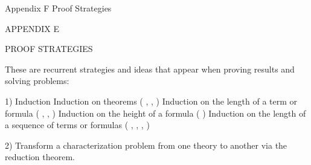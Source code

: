  {Appendix F Proof Strategies}
\centerline{\xmplbxi APPENDIX E}
\medskip
\centerline{\xmplbx PROOF STRATEGIES}
\bigskip

These are recurrent strategies and ideas that appear when proving results and solving problems:

\item{1)} Induction
 Induction on theorems (
  , 
  ,
  )
 Induction on the length of a term or formula (
  ,
  ,
  )
 Induction on the height of a formula (
  )
 Induction on the length of a sequence of terms or formulas (
  ,
  ,
  ,
  )
\item{2)} Transform a characterization problem from one theory to another via the reduction theorem.


\vfill
\break

